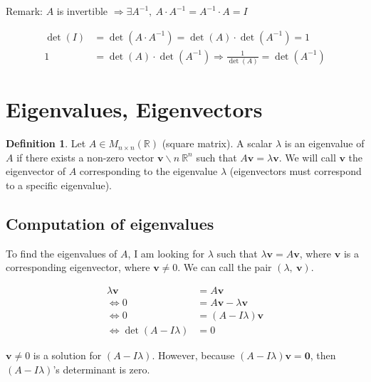 \documentclass[12pt]{article}
\theoremstyle{plain}
\theoremstyle{remark}
\theoremstyle{definition}
\newtheorem{definition}{Definition}[section]
\begin{document}
Remark: \(A\) is invertible
\(\Rightarrow \exists A^{- 1},\ A \cdot A^{- 1} = A^{- 1} \cdot A = I\)

\begin{align*}
\det(I) &= \det\left( A \cdot A^{- 1} \right) = \det(A) \cdot \det\left( A^{- 1} \right) = 1 \\
1 &= \det(A) \cdot \det\left( A^{- 1} \right) \Rightarrow \frac{1}{\det(A)} = \det\left( A^{- 1} \right)
\end{align*}



\section{Eigenvalues, Eigenvectors}

\begin{definition}
Let
\(A \in M_{n \times n}\left( \mathbb{R} \right)\) (square matrix). A
scalar \(\lambda\) is an eigenvalue of \(A\) if there exists a non-zero
vector \(\mathbf{v}\backslash n\ \mathbb{R}^{n}\) such that
\(A\mathbf{v} = \lambda\mathbf{v}\). We will call
\(\mathbf{v}\) the eigenvector of \(A\) corresponding to the
eigenvalue \(\lambda\) (eigenvectors must correspond to a specific
eigenvalue).
\end{definition}


\subsection{Computation of
eigenvalues}

To find the eigenvalues of \(A\), I am looking for \(\lambda\) such that
\(\lambda\mathbf{v} = A\mathbf{v}\), where \(\mathbf{v}\) is
a corresponding eigenvector, where \(\mathbf{v} \neq 0\). We can
call the pair \(\left( \lambda,\ \mathbf{v} \right)\).

\begin{align*}
\lambda\mathbf{v} &= A\mathbf{v} \\
\Leftrightarrow 0 &= A\mathbf{v} - \lambda\mathbf{v} \\
\Leftrightarrow 0 &= (A - I\lambda)\mathbf{v} \\
\Leftrightarrow \det(A - I\lambda) &= 0
\end{align*}


\(\mathbf{v} \neq 0\) is a solution for
\(\left( A - I\lambda  \right)\). However, because
\(\left( A - I\lambda  \right)\mathbf{v} = \mathbf{0}\), then
\(\left( A - I\lambda  \right)\)'s determinant is zero.
\end{document}
